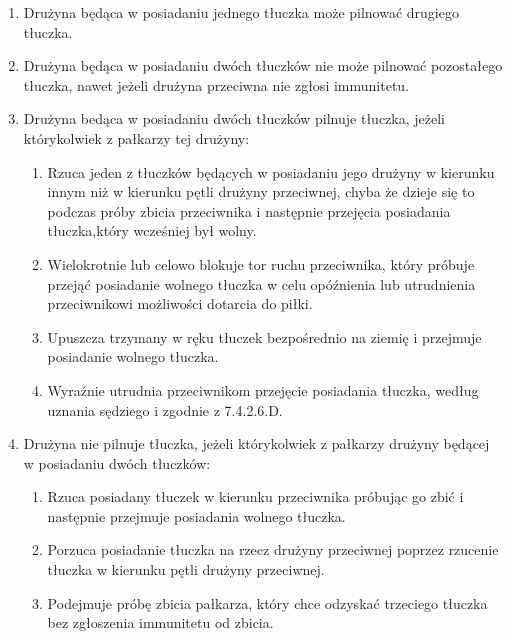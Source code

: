 \documentclass[12pt]{article}
\begin{document}
\begin{enumerate}
	\item
	      Drużyna będąca w posiadaniu jednego tłuczka może pilnować drugiego
	      tłuczka.
	\item
	      Drużyna będąca w posiadaniu dwóch tłuczków nie może pilnować
	      pozostałego tłuczka, nawet jeżeli drużyna przeciwna nie zgłosi
	      immunitetu.
	\item
	      Drużyna bedąca w posiadaniu dwóch tłuczków pilnuje tłuczka, jeżeli
	      którykolwiek z pałkarzy tej drużyny:

	      \begin{enumerate}
		      \item
		            Rzuca jeden z tłuczków będących w posiadaniu jego drużyny w kierunku
		            innym niż w kierunku pętli drużyny przeciwnej, chyba że dzieje się
		            to podczas próby zbicia przeciwnika i następnie przejęcia posiadania
		            tłuczka,który wcześniej był wolny.
		      \item
		            Wielokrotnie lub celowo blokuje tor ruchu przeciwnika, który próbuje
		            przejąć posiadanie wolnego tłuczka w celu opóźnienia lub utrudnienia
		            przeciwnikowi możliwości dotarcia do piłki.
		      \item
		            Upuszcza trzymany w ręku tłuczek bezpośrednio na ziemię i przejmuje
		            posiadanie wolnego tłuczka.
		      \item
		            Wyraźnie utrudnia przeciwnikom przejęcie posiadania tłuczka, według
		            uznania sędziego i zgodnie z 7.4.2.6.D.
	      \end{enumerate}
	\item
	      Drużyna nie pilnuje tłuczka, jeżeli którykolwiek z pałkarzy drużyny
	      będącej w posiadaniu dwóch tłuczków:

	      \begin{enumerate}
		      \item
		            Rzuca posiadany tłuczek w kierunku przeciwnika próbując go zbić i
		            następnie przejmuje posiadania wolnego tłuczka.
		      \item
		            Porzuca posiadanie tłuczka na rzecz drużyny przeciwnej poprzez
		            rzucenie tłuczka w kierunku pętli drużyny przeciwnej.
		      \item
		            Podejmuje próbę zbicia pałkarza, który chce odzyskać trzeciego
		            tłuczka bez zgłoszenia immunitetu od zbicia.
	      \end{enumerate}
\end{enumerate}
\end{document}
